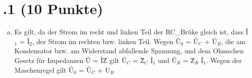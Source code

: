 \section*{\nr.1 \titone (10 Punkte)}
\begin{enumerate}[(a)]
\item
Es gilt, da der Strom im recht und linken Teil der RC_Brüke gleich ist, dass Î$_1$ = Î$_2$, der Strom im rechten bzw. linken Teil. Wegen Û$_0$ = Û$_C$ + Û$_R$, die am Kondensator bzw. am Widerstand abfallende Spannung, und dem Ohmschen Gesetz für Impedanzen Û = ÎẐ gilt Û$_C$ = Ẑ$_C$ Î$_1$ und Û$_R$ = Ẑ$_R$ Î$_1$. Wegen der Maschenregel gilt Û$_0$ = Û$_C$ + U$_R$
\end{enumerate}

